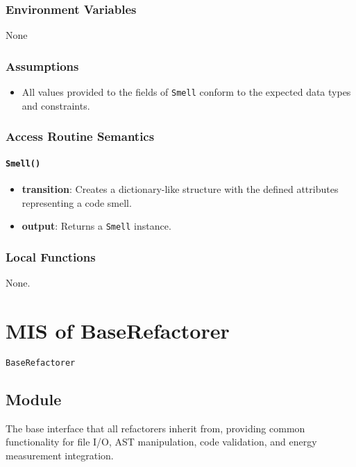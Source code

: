 \documentclass[12pt, titlepage]{article}
\begin{document}
\subsubsection{Environment Variables}
None

\subsubsection{Assumptions}
\begin{itemize}
  \item All values provided to the fields of \texttt{Smell} conform to the expected data types and constraints.
\end{itemize}

\subsubsection{Access Routine Semantics}

\paragraph{\texttt{Smell()}}
\begin{itemize}
  \item \textbf{transition}: Creates a dictionary-like structure with the defined attributes representing a code smell.
  \item \textbf{output}: Returns a \texttt{Smell} instance.
\end{itemize}

\subsubsection{Local Functions}
None.
  

\newpage

\section{MIS of BaseRefactorer} \label{mis:baseR}

\texttt{BaseRefactorer}

\subsection{Module}

The base interface that all refactorers inherit from, providing common functionality for file I/O, AST manipulation, code validation, and energy measurement integration.
\end{document}
